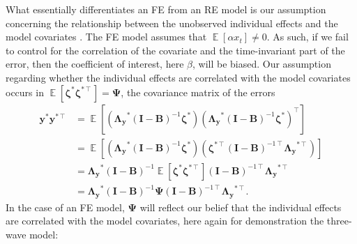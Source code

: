 \documentclass[]{interact}
\theoremstyle{plain}%
\theoremstyle{definition}
\theoremstyle{remark}
\begin{document}
What essentially differentiates an FE from an RE model is our assumption
concerning the relationship between the unobserved individual effects
and the model covariates \citep{Bollen2010}. The FE model assumes that
\(\mathop{\mathrm{\mathbb{E}}}[\alpha x_{t}] \ne 0\). As such, if we
fail to control for the correlation of the covariate and the
time-invariant part of the error, then the coefficient of interest, here
\(\beta\), will be biased. Our assumption regarding whether the
individual effects are correlated with the model covariates occurs in
\(\mathop{\mathrm{\mathbb{E}}}[\bm{\zeta}^{*}\bm{\zeta}^{* \intercal}] = \bm{\Psi}\),
the covariance matrix of the errors \begin{align}
\bm{y}^{*}\bm{y}^{* \intercal} & = \mathop{\mathrm{\mathbb{E}}}[(\bm{\Lambda_{y}}^{*}(\bm{I} - \bm{B})^{-1}\bm{\zeta}^{*})(\bm{\Lambda_{y}}^{*}(\bm{I} - \bm{B})^{-1}\bm{\zeta}^{*})^{\intercal}] \\
 & = \mathop{\mathrm{\mathbb{E}}}[(\bm{\Lambda_{y}}^{*}(\bm{I} - \bm{B})^{-1}\bm{\zeta}^{*})(\bm{\zeta}^{* \intercal}(\bm{I} - \bm{B})^{-1 \intercal}\bm{\Lambda_{y}}^{* \intercal})] \\
 & = \bm{\Lambda_{y}}^{*}(\bm{I} - \bm{B})^{-1} \mathop{\mathrm{\mathbb{E}}}[\bm{\zeta}^{*}\bm{\zeta}^{* \intercal}] (\bm{I} - \bm{B})^{-1 \intercal}\bm{\Lambda_{y}}^{* \intercal} \\
 & = \bm{\Lambda_{y}}^{*}(\bm{I} - \bm{B})^{-1} \bm{\Psi} (\bm{I} - \bm{B})^{-1 \intercal}\bm{\Lambda_{y}}^{* \intercal}.
\end{align} In the case of an FE model, \(\bm{\Psi}\) will reflect our
belief that the individual effects are correlated with the model
covariates, here again for demonstration the three-wave model:
\end{document}
